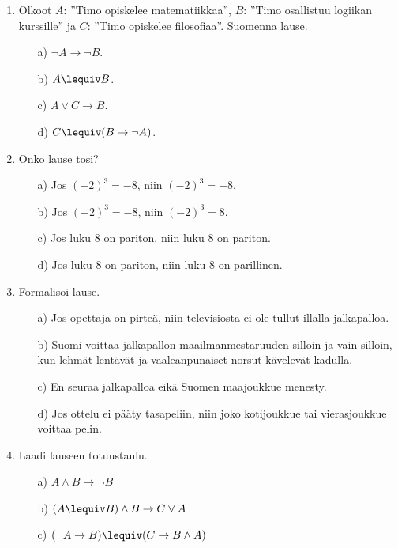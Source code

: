 \begin{enumerate}

\item
Olkoot $A$: ''Timo opiskelee matematiikkaa'', $B$: ''Timo osallistuu logiikan kurssille'' ja $C$: ''Timo opiskelee filosofiaa''. Suomenna lause.
\begin{itemize}
\item[a)] $\lnot A \to \lnot B$.
\item[b)] $A\lequiv B$.
\item[c)] $A\lor C \to B$.
\item[d)] $C\lequiv (B\to \lnot A)$.
\end{itemize}

\item Onko lause tosi?
\begin{itemize}
\item[a)] Jos $(-2)^3= -8$, niin $(-2)^3= -8$.
\item[b)] Jos $(-2)^3= -8$, niin $(-2)^3=  8$.
\item[c)] Jos luku $8$ on pariton, niin luku $8$ on pariton.
\item[d)] Jos luku $8$ on pariton, niin luku $8$ on parillinen.
\end{itemize}

\item
Formalisoi lause.
\begin{itemize}
\item[a)] Jos opettaja on pirteä, niin televisiosta ei ole tullut illalla jalkapalloa.
\item[b)] Suomi voittaa jalkapallon maailmanmestaruuden silloin ja vain silloin, kun lehmät lentävät ja vaaleanpunaiset norsut kävelevät kadulla.
\item[c)] En seuraa jalkapalloa eikä Suomen maajoukkue menesty. 
\item[d)] Jos ottelu ei pääty tasapeliin, niin joko kotijoukkue tai vierasjoukkue voittaa pelin.
\end{itemize}

\item Laadi lauseen totuustaulu.
\begin{itemize}
\item[a)] $A\land B\to \lnot B$
\item[b)] $(A\lequiv B)\land B\to C\lor A$
\item[c)] $(\lnot A\to B)\lequiv (C\to B\land A)$
\end{itemize}



\end{enumerate}
